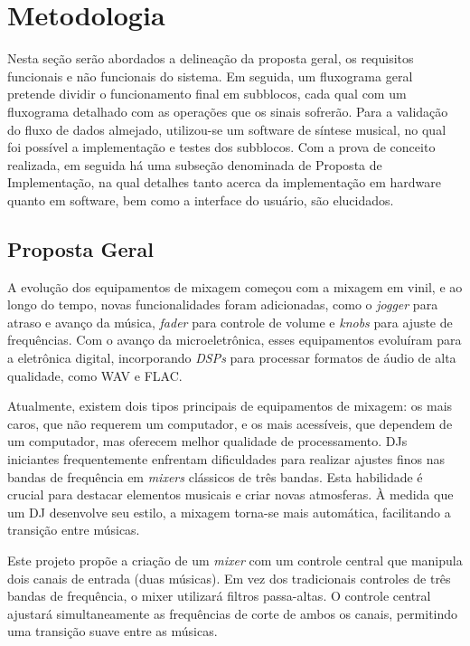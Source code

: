 \chapter[Metodologia]{Metodologia}

Nesta seção serão abordados a delineação da proposta geral, os requisitos funcionais e não funcionais do sistema. Em seguida, um fluxograma geral pretende dividir o funcionamento final em subblocos, cada qual com um fluxograma detalhado com as operações que os sinais sofrerão.
Para a validação do fluxo de dados almejado, utilizou-se um software de síntese musical, no qual foi possível a implementação e testes dos subblocos. 
Com a prova de conceito realizada, em seguida há uma subseção denominada de Proposta de Implementação, na qual detalhes tanto acerca da implementação em hardware quanto em software, bem como a interface do usuário, são elucidados.

\section{Proposta Geral}

A evolução dos equipamentos de mixagem começou com a mixagem em vinil, e ao longo do tempo, novas funcionalidades foram adicionadas, como o \textit{jogger} para atraso e avanço da música, \textit{fader} para controle de volume e \textit{knobs} para ajuste de frequências. Com o avanço da microeletrônica, esses equipamentos evoluíram para a eletrônica digital, incorporando \textit{DSPs} para processar formatos de áudio de alta qualidade, como WAV e FLAC.

Atualmente, existem dois tipos principais de equipamentos de mixagem: os mais caros, que não requerem um computador, e os mais acessíveis, que dependem de um computador, mas oferecem melhor qualidade de processamento. DJs iniciantes frequentemente enfrentam dificuldades para realizar ajustes finos nas bandas de frequência em \textit{mixers} clássicos de três bandas. Esta habilidade é crucial para destacar elementos musicais e criar novas atmosferas. À medida que um DJ desenvolve seu estilo, a mixagem torna-se mais automática, facilitando a transição entre músicas.

Este projeto propõe a criação de um \textit{mixer} com um controle central que manipula dois canais de entrada (duas músicas). Em vez dos tradicionais controles de três bandas de frequência, o mixer utilizará filtros passa-altas. O controle central ajustará simultaneamente as frequências de corte de ambos os canais, permitindo uma transição suave entre as músicas.

